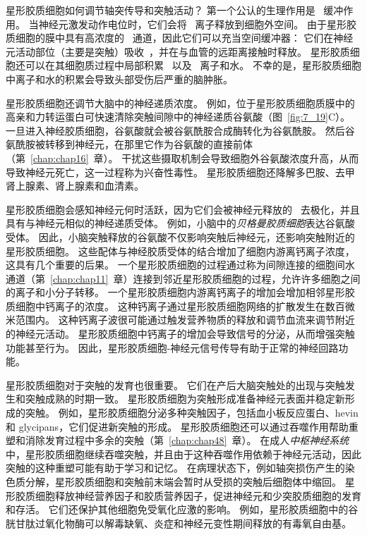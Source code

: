 星形胶质细胞如何调节轴突传导和突触活动？
第一个公认的生理作用是~ 缓冲作用。
当神经元激发动作电位时，它们会将~ 离子释放到细胞外空间。
由于星形胶质细胞的膜中具有高浓度的~ 通道，因此它们可以充当空间缓冲器：
它们在神经元活动部位（主要是突触）吸收~，并在与血管的远距离接触时释放。
星形胶质细胞还可以在其细胞质过程中局部积累~ 以及~ 离子和水。
不幸的是，星形胶质细胞中离子和水的积累会导致头部受伤后严重的脑肿胀。


星形胶质细胞还调节大脑中的神经递质浓度。
例如，位于星形胶质细胞质膜中的高亲和力转运蛋白可快速清除突触间隙中的神经递质谷氨酸（图~\ref{fig:7_19}C）。
一旦进入神经胶质细胞，谷氨酸就会被谷氨酰胺合成酶转化为谷氨酰胺。
然后谷氨酰胺被转移到神经元，在那里它作为谷氨酸的直接前体（第~\ref{chap:chap16}~章）。
干扰这些摄取机制会导致细胞外谷氨酸浓度升高，从而导致神经元死亡，这一过程称为兴奋性毒性。
星形胶质细胞还降解多巴胺、去甲肾上腺素、肾上腺素和血清素。


星形胶质细胞会感知神经元何时活跃，因为它们会被神经元释放的~ 去极化，并且具有与神经元相似的神经递质受体。
例如，小脑中的\textit{贝格曼胶质细胞}表达谷氨酸受体。
因此，小脑突触释放的谷氨酸不仅影响突触后神经元，还影响突触附近的星形胶质细胞。
这些配体与神经胶质受体的结合增加了细胞内游离钙离子浓度，这具有几个重要的后果。
一个星形胶质细胞的过程通过称为间隙连接的细胞间水通道（第~\ref{chap:chap11}~章）连接到邻近星形胶质细胞的过程，允许许多细胞之间的离子和小分子转移。 
一个星形胶质细胞内游离钙离子的增加会增加相邻星形胶质细胞中钙离子的浓度。
这种钙离子通过星形胶质细胞网络的扩散发生在数百微米范围内。
这种钙离子波很可能通过触发营养物质的释放和调节血流来调节附近的神经元活动。
星形胶质细胞中钙离子的增加会导致信号的分泌，从而增强突触功能甚至行为。
因此，星形胶质细胞-神经元信号传导有助于正常的神经回路功能。


星形胶质细胞对于突触的发育也很重要。
它们在产后大脑突触处的出现与突触发生和突触成熟的时期一致。
星形胶质细胞为突触形成准备神经元表面并稳定新形成的突触。
例如，星形胶质细胞分泌多种突触因子，包括血小板反应蛋白、hevin 和 glycipans，它们促进新突触的形成。
星形胶质细胞还可以通过吞噬作用帮助重塑和消除发育过程中多余的突触（第~\ref{chap:chap48}~章）。
在成人\textit{中枢神经系统}中，星形胶质细胞继续吞噬突触，并且由于这种吞噬作用依赖于神经元活动，因此突触的这种重塑可能有助于学习和记忆。
在病理状态下，例如轴突损伤产生的染色质分解，星形胶质细胞和突触前末端会暂时从受损的突触后细胞体中缩回。
星形胶质细胞释放神经营养因子和胶质营养因子，促进神经元和少突胶质细胞的发育和存活。
它们还保护其他细胞免受氧化应激的影响。
例如，星形胶质细胞中的谷胱甘肽过氧化物酶可以解毒缺氧、炎症和神经元变性期间释放的有毒氧自由基。


